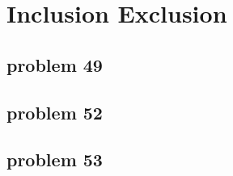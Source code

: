 \section{Inclusion Exclusion}

\subsection{problem 49}


\subsection{problem 52}


\subsection{problem 53}
